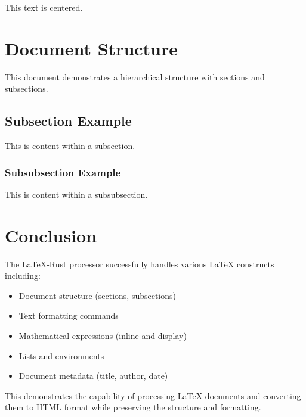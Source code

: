 \documentclass{article}
\begin{document}
\begin{center}
This text is centered.
\end{center}

\section{Document Structure}

This document demonstrates a hierarchical structure with sections and subsections.

\subsection{Subsection Example}

This is content within a subsection.

\subsubsection{Subsubsection Example}

This is content within a subsubsection.

\section{Conclusion}

The LaTeX-Rust processor successfully handles various LaTeX constructs including:

\begin{itemize}
\item Document structure (sections, subsections)
\item Text formatting commands
\item Mathematical expressions (inline and display)
\item Lists and environments
\item Document metadata (title, author, date)
\end{itemize}

This demonstrates the capability of processing LaTeX documents and converting them to HTML format while preserving the structure and formatting.
\end{document}
